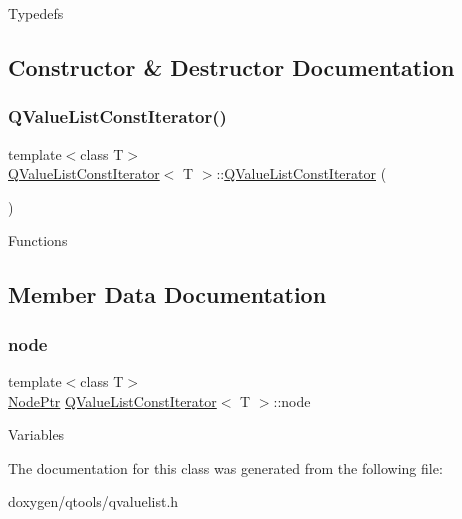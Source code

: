 Typedefs 

\subsection{Constructor \& Destructor Documentation}
\mbox{\label{class_q_value_list_const_iterator_adc6d0a8fab8a6d737806fdee6537ac61}} 
\subsubsection{\texorpdfstring{QValueListConstIterator()}{QValueListConstIterator()}}
{\footnotesize\ttfamily template$<$class T$>$ \\
\mbox{\hyperlink{class_q_value_list_const_iterator}{Q\+Value\+List\+Const\+Iterator}}$<$ T $>$\+::\mbox{\hyperlink{class_q_value_list_const_iterator}{Q\+Value\+List\+Const\+Iterator}} (\begin{DoxyParamCaption}{ }\end{DoxyParamCaption})\hspace{0.3cm}{\ttfamily [inline]}}

Functions 

\subsection{Member Data Documentation}
\mbox{\label{class_q_value_list_const_iterator_a1dab8df146adb2bbd660fb44818aa225}} 
\subsubsection{\texorpdfstring{node}{node}}
{\footnotesize\ttfamily template$<$class T$>$ \\
\mbox{\hyperlink{class_q_value_list_const_iterator_a2416aa81d7180a7e83fd7ddc334ec5d1}{Node\+Ptr}} \mbox{\hyperlink{class_q_value_list_const_iterator}{Q\+Value\+List\+Const\+Iterator}}$<$ T $>$\+::node}

Variables 

The documentation for this class was generated from the following file\+:\begin{DoxyCompactItemize}
\item 
doxygen/qtools/qvaluelist.\+h\end{DoxyCompactItemize}
